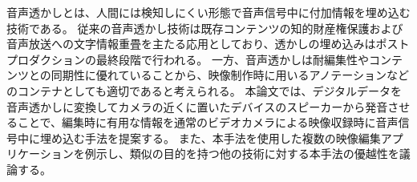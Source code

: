 \begin{jabstract}
音声透かしとは、人間には検知しにくい形態で音声信号中に付加情報を埋め込む技術である。
従来の音声透かし技術は既存コンテンツの知的財産権保護および音声放送への文字情報重畳を主たる応用としており、透かしの埋め込みはポストプロダクションの最終段階で行われる。
一方、音声透かしは耐編集性やコンテンツとの同期性に優れていることから、映像制作時に用いるアノテーションなどのコンテナとしても適切であると考えられる。
本論文では、デジタルデータを音声透かしに変換してカメラの近くに置いたデバイスのスピーカーから発音させることで、編集時に有用な情報を通常のビデオカメラによる映像収録時に音声信号中に埋め込む手法を提案する。
また、本手法を使用した複数の映像編集アプリケーションを例示し、類似の目的を持つ他の技術に対する本手法の優越性を議論する。
\end{jabstract}